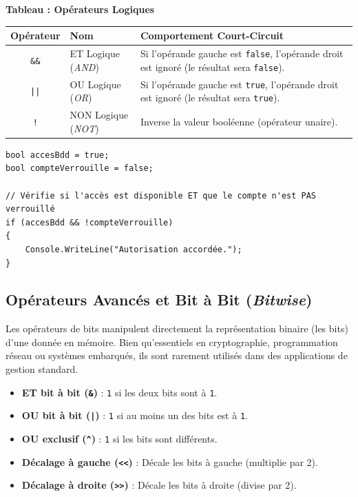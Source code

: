 \begin{center}
    \textbf{Tableau : Opérateurs Logiques} \\[0.3cm]
    \begin{tabular}{@{}clp{9cm}@{}}
        \toprule
        \textbf{Opérateur} & \textbf{Nom} & \textbf{Comportement Court-Circuit} \\
        \midrule
        \texttt{\&\&} & ET Logique (\emph{AND}) & Si l'opérande gauche est \texttt{false}, l'opérande droit est ignoré (le résultat sera \texttt{false}). \\
        \texttt{||} & OU Logique (\emph{OR}) & Si l'opérande gauche est \texttt{true}, l'opérande droit est ignoré (le résultat sera \texttt{true}). \\
        \texttt{!} & NON Logique (\emph{NOT}) & Inverse la valeur booléenne (opérateur unaire). \\
        \bottomrule
    \end{tabular}
\end{center}

\begin{lstlisting}[caption={Évaluation logique conditionnelle}]
bool accesBdd = true;
bool compteVerrouille = false;

// Vérifie si l'accès est disponible ET que le compte n'est PAS verrouillé
if (accesBdd && !compteVerrouille)
{
    Console.WriteLine("Autorisation accordée.");
}
\end{lstlisting}

\subsection{Opérateurs Avancés et Bit à Bit (\emph{Bitwise})}

Les opérateurs de bits manipulent directement la représentation binaire (les bits) d'une donnée en mémoire. Bien qu'essentiels en cryptographie, programmation réseau ou systèmes embarqués, ils sont rarement utilisés dans des applications de gestion standard.

\begin{itemize}
    \item \textbf{ET bit à bit (\texttt{\&})} : \texttt{1} si les deux bits sont à \texttt{1}.
    \item \textbf{OU bit à bit (\texttt{|})} : \texttt{1} si au moins un des bits est à \texttt{1}.
    \item \textbf{OU exclusif (\texttt{\textasciicircum})} : \texttt{1} si les bits sont différents.
    \item \textbf{Décalage à gauche (\texttt{<<})} : Décale les bits à gauche (multiplie par 2).
    \item \textbf{Décalage à droite (\texttt{>>})} : Décale les bits à droite (divise par 2).
\end{itemize}

